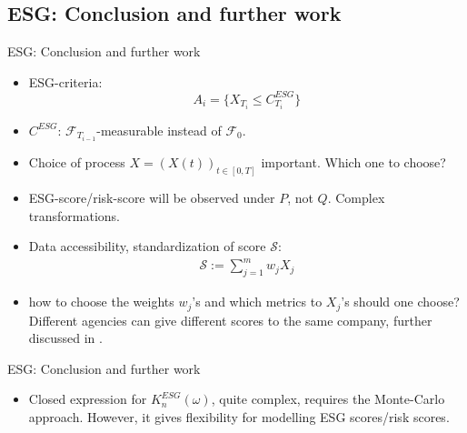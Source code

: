 \documentclass[UKenglish]{beamer}
\newcommand{\F}{\mathcal{F}} %
\begin{document}
\subsection{ESG: Conclusion and further work}
\begin{frame}{ESG: Conclusion and further work}
\begin{itemize}
    \item ESG-criteria: 
    \[
    A_{i} = \{X_{T_{i}} \leq C_{T_{i}}^{ESG}\}
    \]
    \item $C^{ESG}$: $\F_{T_{i-1}}$-measurable instead of $\F_{0}$. 
    \item Choice of process $X = (X(t))_{t\in[0,T]}$ important. Which one to choose? 
    \item ESG-score/risk-score will be observed under $P$, not $Q$. Complex transformations. 
    \item Data accessibility, standardization of score $\mathcal{S}$: 
    \begin{align*}
     \mathcal{S} := \sum_{j=1}^{m}w_{j}X_{j}   
    \end{align*}
    \item how to choose the weights $w_{j}$'s and which metrics to $X_{j}$'s should one choose?
    Different agencies can give different scores to the same company, further discussed in \cite{Billio2021}.  
\end{itemize}
\end{frame}


\begin{frame}{ESG: Conclusion and further work}
\begin{itemize}
    \item Closed expression for $K_{n}^{ESG}(\omega)$, quite complex, requires the Monte-Carlo approach. However, it gives flexibility for modelling ESG scores/risk scores. 
\end{itemize}
\end{frame}

\end{document}
